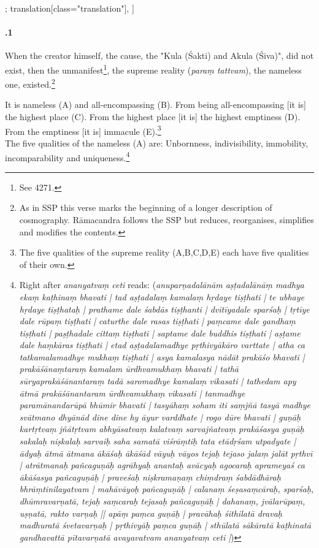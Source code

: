 \begin{alignment}[
  texts=edition[class="edition"];
  translation[class="translation"],
  ]
\begin{translation}
\begin{tlate}[48_1]
     \paragraph{.1} When the creator himself, the cause, the "Kula (Śakti) and Akula (Śiva)", did not exist, then the unmanifest\footnote{See \citeauthor{peterson1888} 4271.}, the supreme reality (\textit{paraṃ tattvam}), the nameless one, existed.\footnote{As in SSP this verse marks the beginning of a longer description of cosmography. Rāmacandra follows the SSP but reduces, reorganises, simplifies and modifies the contents.}\\
   \end{tlate}
   \begin{tlate}[p48_02]
     It is nameless (A) and all-encompassing (B). From being all-encompassing [it is] the highest place (C). From the highest place [it is] the highest emptiness (D). From the emptiness [it is] immacule (E).\footnote{The five qualities of the supreme reality (A,B,C,D,E) each have five qualities of their own.} \\
     
     \indent
     The five qualities of the nameless (A) are: Unbornness, indivisibility, immobility, incomparability and uniqueness.\footnote{Right after \textit{ananyatvaṃ ceti}  reads: (\textit{anuparṇadalānām aṣṭadalānāṃ madhya ekaṃ kaṭhinaṃ bhavati | tad aṣṭadalaṃ kamalaṃ hṛdaye tiṣṭhati | te ubhaye hṛdaye tiṣṭhataḥ | prathame dale śabdās tiṣṭhanti | dvitīyadale sparśaḥ | tṛtīye dale rūpaṃ tiṣṭhati | caturthe dale rasas tiṣṭhati | paṃcame dale gandhaṃ tiṣṭhati | paṣṭhadale cittaṃ tiṣṭhati | saptame dale buddhis tiṣṭhati | aṣṭame dale haṃkāras tiṣṭhati | etad aṣṭadalamadhye pṛthivyākāro varttate | atha ca tatkamalamadhye mukhaṃ tiṣṭhati | asya kamalasya nādāt prakāśo bhavati | prakāśānaṃtaraṃ kamalam ūrdhvamukhaṃ bhavati | tathā sūryaprakāśānantaraṃ tadā saromadhye kamalaṃ vikasati | tathedam apy ātmā prakāśānantaram ūrdhvamukhaṃ vikasati | tanmadhye paramānandarūpā bhūmir bhavati | tasyāhaṃ soham iti saṃjñā tasyā madhye svātmano dhyānād dine dine hy āyur varddhate | rogo dūre bhavati | guṇāḥ kartṛtvaṃ jñātṛtvam abhyāsatvaṃ kalatvaṃ sarvajñatvaṃ prakāśasya guṇāḥ sakalaḥ niṣkalaḥ sarvaiḥ saha samatā viśrāṃtiḥ tata etādṛśam utpadyate | ādyaḥ ātmā ātmana ākāśaḥ ākāśād vāyuḥ vāyos tejaḥ tejaso jalaṃ jalāt pṛthvī | atrātmanaḥ pañcaguṇāḥ agrāhyaḥ anantaḥ avācyaḥ agocaraḥ aprameyaś ca ākāśasya pañcaguṇāḥ | praveśaḥ niṣkramaṇaṃ chiṃdraṃ śabdādhāraḥ bhrāṃtinilayatvam | mahāvāyoḥ pañcaguṇāḥ | calanaṃ śeṣasaṃcāraḥ, sparśaḥ, dhūmravarṇatā, tejaḥ saṃcaraḥ tejasaḥ pañcaguṇāḥ | dahanaṃ, jvālarūpaṃ, uṣṇatā, rakto varṇaḥ || apāṃ paṃca guṇāḥ | pravāhaḥ śithilatā dravaḥ madhuratā śvetavarṇaḥ | pṛthivyāḥ paṃca guṇāḥ | sthūlatā sākāratā kaṭhinatā gandhavattā pītavarṇatā avayavatvam ananyatvaṃ ceti |})}\\
     

\end{tlate}
\end{translation}
\end{alignment}
